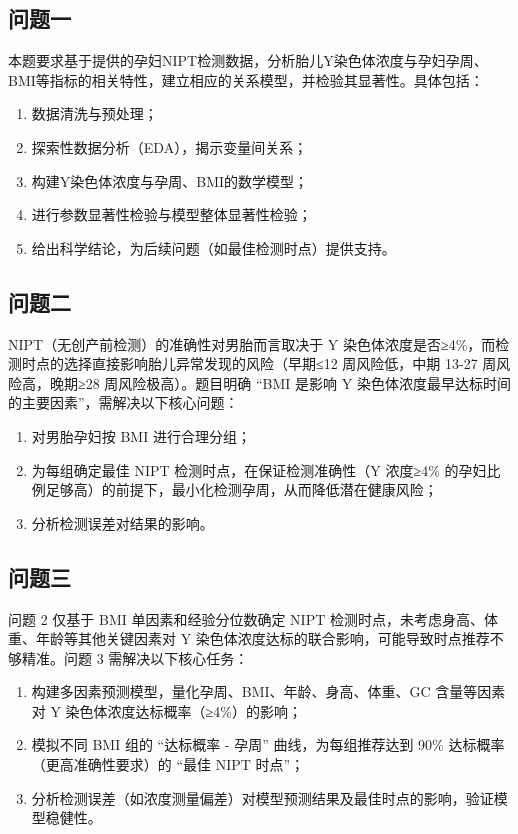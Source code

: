 \documentclass[withoutpreface,bwprint]{cumcmthesis} %
\begin{document}
\subsection{问题一}
本题要求基于提供的孕妇NIPT检测数据，分析胎儿Y染色体浓度与孕妇孕周、BMI等指标的相关特性，建立相应的关系模型，并检验其显著性。具体包括：
\begin{enumerate}
    \item 数据清洗与预处理；
    \item 探索性数据分析（EDA），揭示变量间关系；
    \item 构建Y染色体浓度与孕周、BMI的数学模型；
    \item 进行参数显著性检验与模型整体显著性检验；
    \item 给出科学结论，为后续问题（如最佳检测时点）提供支持。
\end{enumerate}

\subsection{问题二}
NIPT（无创产前检测）的准确性对男胎而言取决于 Y 染色体浓度是否≥4\%，而检测时点的选择直接影响胎儿异常发现的风险（早期≤12 周风险低，中期 13-27 周风险高，晚期≥28 周风险极高）。题目明确 “BMI 是影响 Y 染色体浓度最早达标时间的主要因素”，需解决以下核心问题：
\begin{enumerate}
    \item 对男胎孕妇按 BMI 进行合理分组；
    \item 为每组确定最佳 NIPT 检测时点，在保证检测准确性（Y 浓度≥4\% 的孕妇比例足够高）的前提下，最小化检测孕周，从而降低潜在健康风险；
    \item 分析检测误差对结果的影响。
\end{enumerate}


\subsection{问题三}
问题 2 仅基于 BMI 单因素和经验分位数确定 NIPT 检测时点，未考虑身高、体重、年龄等其他关键因素对 Y 染色体浓度达标的联合影响，可能导致时点推荐不够精准。问题 3 需解决以下核心任务：

\begin{enumerate}
    \item 构建多因素预测模型，量化孕周、BMI、年龄、身高、体重、GC 含量等因素对 Y 染色体浓度达标概率（≥4\%）的影响；
    \item 模拟不同 BMI 组的 “达标概率 - 孕周” 曲线，为每组推荐达到 90\% 达标概率（更高准确性要求）的 “最佳 NIPT 时点”；
    \item 分析检测误差（如浓度测量偏差）对模型预测结果及最佳时点的影响，验证模型稳健性。
\end{enumerate}
\end{document}
